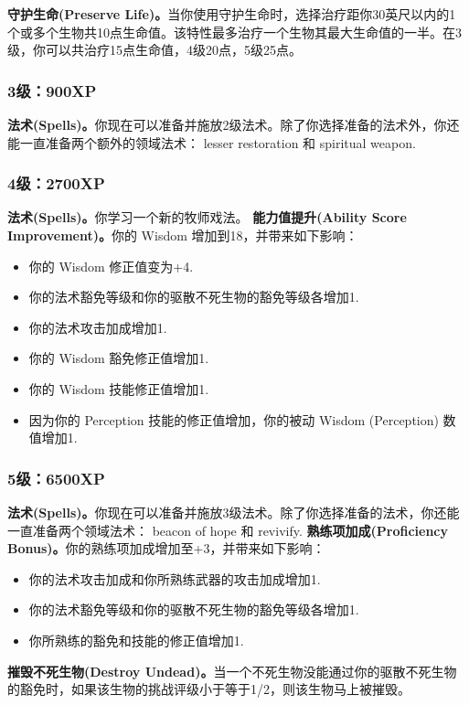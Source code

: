 \documentclass[letterpaper,twocolumn,openany,nodeprecatedcode]{dndbook}
\begin{document}
\textbf{守护生命(Preserve Life)。}当你使用守护生命时，选择治疗距你30英尺以内的1个或多个生物共10点生命值。该特性最多治疗一个生物其最大生命值的一半。在3级，你可以共治疗15点生命值，4级20点，5级25点。

\subsubsection{3级：900XP}
\textbf{法术(Spells)。}你现在可以准备并施放2级法术。除了你选择准备的法术外，你还能一直准备两个额外的领域法术： lesser restoration 和 spiritual weapon.

\subsubsection{4级：2700XP}
\textbf{法术(Spells)。}你学习一个新的牧师戏法。
\textbf{能力值提升(Ability Score Improvement)。}你的 Wisdom 增加到18，并带来如下影响：
\begin{itemize}
\item 你的 Wisdom 修正值变为+4.
\item 你的法术豁免等级和你的驱散不死生物的豁免等级各增加1.
\item 你的法术攻击加成增加1.
\item 你的 Wisdom 豁免修正值增加1.
\item 你的 Wisdom 技能修正值增加1.
\item 因为你的 Perception 技能的修正值增加，你的被动 Wisdom (Perception) 数值增加1.
\end{itemize}

\subsubsection{5级：6500XP}
\textbf{法术(Spells)。}你现在可以准备并施放3级法术。除了你选择准备的法术，你还能一直准备两个领域法术： beacon of hope 和 revivify.
\textbf{熟练项加成(Proficiency Bonus)。}你的熟练项加成增加至+3，并带来如下影响：
\begin{itemize}
\item 你的法术攻击加成和你所熟练武器的攻击加成增加1.
\item 你的法术豁免等级和你的驱散不死生物的豁免等级各增加1.
\item 你所熟练的豁免和技能的修正值增加1.
\end{itemize}

\textbf{摧毁不死生物(Destroy Undead)。}当一个不死生物没能通过你的驱散不死生物的豁免时，如果该生物的挑战评级小于等于1/2，则该生物马上被摧毁。
\end{document}
